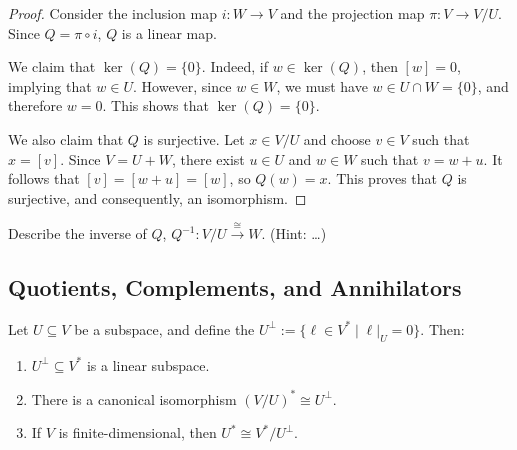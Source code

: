 \begin{proof}
  Consider the inclusion map $i \colon W \to V$ and the projection map $\pi \colon V \to V/U$. Since $Q = \pi \circ i$, $Q$ is a linear map.

  We claim that $\ker(Q) = \{0\}$. Indeed, if $w \in \ker(Q)$, then $[w] = 0$, implying that $w \in U$. However, since $w \in W$, we must have $w \in U \cap W = \{0\}$, and therefore $w = 0$. This shows that $\ker(Q) = \{0\}$.

  We also claim that $Q$ is surjective. Let $x \in V/U$ and choose $v \in V$ such that $x = [v]$. Since $V = U + W$, there exist $u \in U$ and $w \in W$ such that $v = w + u$. It follows that $[v] = [w + u] = [w]$, so $Q(w) = x$. This proves that $Q$ is surjective, and consequently, an isomorphism.
\end{proof}

\begin{exercise}
  Describe the inverse of $Q$, $Q^{-1} \colon V/U \xrightarrow{\cong} W$. (Hint: \dots)
\end{exercise}

\subsection{Quotients, Complements, and Annihilators}

\begin{proposition}
  Let $U \subseteq V$ be a subspace, and define the  $U^\perp := \{\ell \in V^* \mid \ell|_U = 0\}$. Then:
  \begin{enumerate}
    \item $U^\perp \subseteq V^*$ is a linear subspace.
    \item There is a canonical isomorphism $(V/U)^* \cong U^\perp$.
    \item If $V$ is finite-dimensional, then $U^* \cong V^*/U^\perp$.
  \end{enumerate}
\end{proposition}


